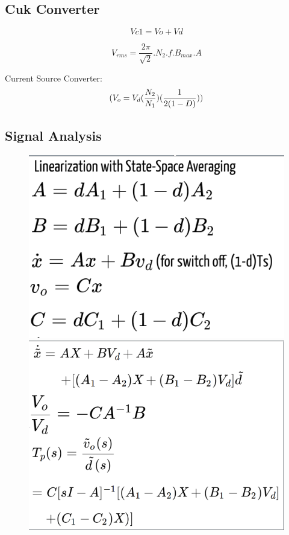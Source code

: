 \documentclass[twocolumn, ]{article}
\begin{document}
\subsection*{\small Cuk Converter}
\small
\begin{equation}
Vc1=Vo+Vd
\end{equation}

\begin{equation}
V_{rms}=\frac{2\pi}{\sqrt{2}}.N_{2}.f.B_{max}.A
\end{equation}

Current Source Converter:
\begin{equation}
(V_o = V_d  (\dfrac{N_2}{N_1})(\dfrac{1}{2(1-D)})\\)
\end{equation}

\subsection*{\small Signal Analysis}
 \begin{figure}[!ht]
	\includegraphics[scale=0.36]{ss1}
\hspace{0.05 cm}
	\includegraphics[scale=0.34]{ss2}
\end{figure}
\end{document}
